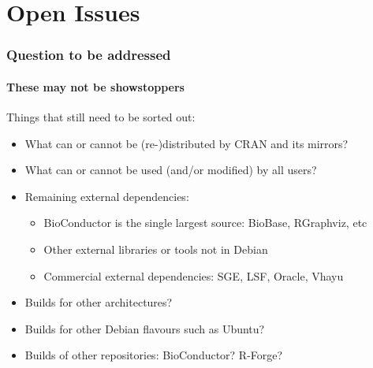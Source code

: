 \documentclass[smaller,compress]{beamer}
\begin{document}
\section{Open Issues}
\begin{frame}
  \frametitle{Question to be addressed}
  \framesubtitle{These may not be showstoppers}

  Things that still need to be sorted out:
  \begin{itemize}
  \item What can or cannot be (re-)distributed by CRAN and its mirrors?
  \item What can or cannot be used (and/or modified) by all users?
  \item Remaining external dependencies: 
    \begin{itemize}
      \item BioConductor is the single largest source: BioBase, RGraphviz, etc
      \item Other external libraries or tools not in Debian 
      \item Commercial external dependencies: SGE, LSF, Oracle, Vhayu
    \end{itemize}
  \item Builds for other architectures?
  \item Builds for other Debian flavours such as Ubuntu?
  \item Builds of other repositories: BioConductor? R-Forge?
  \end{itemize}
\end{frame}
\end{document}
